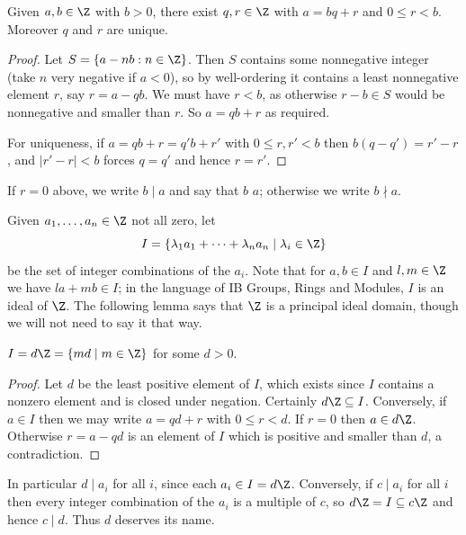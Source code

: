 \begin{theorem}
	Given $a, b \in \Z$ with $b > 0$, there exist $q, r \in \Z$ with $a = bq + r$ and $0 \leq r < b$. Moreover $q$ and $r$ are unique.
\end{theorem}
\begin{proof}
	Let $S = \{a - nb : n \in \Z\}$. Then $S$ contains some nonnegative integer (take $n$ very negative if $a < 0$), so by well-ordering it contains a least nonnegative element $r$, say $r = a - qb$. We must have $r < b$, as otherwise $r - b \in S$ would be nonnegative and smaller than $r$. So $a = qb + r$ as required.

	For uniqueness, if $a = qb + r = q'b + r'$ with $0 \leq r, r' < b$ then $b(q - q') = r' - r$, and $|r' - r| < b$ forces $q = q'$ and hence $r = r'$.
\end{proof}

\begin{definition}
	If $r = 0$ above, we write $b \mid a$ and say that $b$  $a$; otherwise we write $b \nmid a$.
\end{definition}

Given $a_1, \dots, a_n \in \Z$ not all zero, let
$$
I = \{\lambda_1 a_1 + \cdots + \lambda_n a_n \mid \lambda_i \in \Z\}
$$
be the set of integer combinations of the $a_i$. Note that for $a, b \in I$ and $l, m \in \Z$ we have $la + mb \in I$; in the language of IB Groups, Rings and Modules, $I$ is an ideal of $\Z$. The following lemma says that $\Z$ is a principal ideal domain, though we will not need to say it that way.

\begin{lemma}\label{lem:ideal}
	$I = d\Z = \{md \mid m \in \Z\}$ for some $d > 0$.
\end{lemma}
\begin{proof}
	Let $d$ be the least positive element of $I$, which exists since $I$ contains a nonzero element and is closed under negation. Certainly $d\Z \subseteq I$. Conversely, if $a \in I$ then we may write $a = qd + r$ with $0 \leq r < d$. If $r = 0$ then $a \in d\Z$. Otherwise $r = a - qd$ is an element of $I$ which is positive and smaller than $d$, a contradiction.
\end{proof}

In particular $d \mid a_i$ for all $i$, since each $a_i \in I = d\Z$. Conversely, if $c \mid a_i$ for all $i$ then every integer combination of the $a_i$ is a multiple of $c$, so $d\Z = I \subseteq c\Z$ and hence $c \mid d$. Thus $d$ deserves its name.

